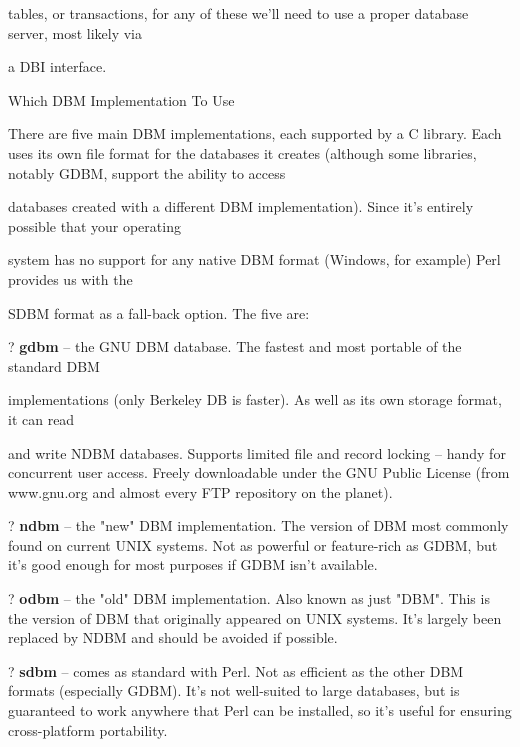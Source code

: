 \documentclass[a4paper,11pt]{book}
\begin{document}
\noindent tables,  or transactions,  for any  of these  we'll  need  to  use  a  proper  database  server,  most  likely  via

\noindent a  DBI interface.

\noindent 

\noindent Which DBM Implementation To Use

\noindent 

\noindent There are five main DBM implementations, each supported by a C library. Each uses its own file format for the databases it creates (although some libraries, notably GDBM, support the ability to access

\noindent databases created with a different DBM implementation). Since it's entirely possible that your operating

\noindent system has no support for any native DBM format (Windows, for example) Perl provides us with the

\noindent SDBM format as a fall-back option. The five are:

\noindent 

\noindent ? \textbf{gdbm   }-- the GNU DBM database. The fastest and most portable of the standard DBM

\noindent implementations (only Berkeley DB is faster). As well as its own storage format, it can read

\noindent and write NDBM databases. Supports limited file and record locking -- handy for concurrent user access. Freely downloadable under the GNU Public License (from www.gnu.org and almost every FTP repository on the planet).

\noindent 

\noindent ? \textbf{ndbm   }-- the "new" DBM implementation. The version of DBM most commonly found on current UNIX systems. Not as powerful or feature-rich as GDBM, but it's good enough for most purposes if GDBM isn't available.

\noindent 

\noindent ? \textbf{odbm   }-- the "old" DBM implementation. Also known as just "DBM". This is the version of DBM that originally appeared on UNIX systems. It's largely been replaced by NDBM and should be avoided if possible.

\noindent 

\noindent ? \textbf{sdbm   }-- comes as standard with Perl. Not as efficient as the other DBM formats (especially GDBM). It's not well-suited to large databases, but is guaranteed to work anywhere that Perl can be installed, so it's useful for ensuring cross-platform portability.
\end{document}
